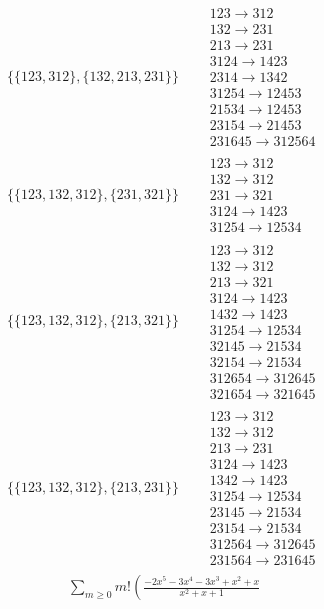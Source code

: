 \begin{tiny}
\begin{align}
\{\{123, 312\}, \{132, 213, 231\}\}
\quad
&
\begin{matrix}
123 \to 312\\132 \to 231\\213 \to 231\\3124 \to 1423\\2314 \to 1342\\31254 \to 12453\\21534 \to 12453\\23154 \to 21453\\231645 \to 312564
\end{matrix}
\\
\{\{123, 132, 312\}, \{231, 321\}\}
\quad
&
\begin{matrix}
123 \to 312\\132 \to 312\\231 \to 321\\3124 \to 1423\\31254 \to 12534
\end{matrix}
\\
\{\{123, 132, 312\}, \{213, 321\}\}
\quad
&
\begin{matrix}
123 \to 312\\132 \to 312\\213 \to 321\\3124 \to 1423\\1432 \to 1423\\31254 \to 12534\\32145 \to 21534\\32154 \to 21534\\312654 \to 312645\\321654 \to 321645
\end{matrix}
\\
\{\{123, 132, 312\}, \{213, 231\}\}
\quad
&
\begin{matrix}
123 \to 312\\132 \to 312\\213 \to 231\\3124 \to 1423\\1342 \to 1423\\31254 \to 12534\\23145 \to 21534\\23154 \to 21534\\312564 \to 312645\\231564 \to 231645
\end{matrix}
\end{align}
$$
\begin{matrix}
\sum_{m \geq 0} m! \left(
\frac{-2 x^{5} - 3 x^{4} - 3 x^{3} + x^{2} + x}{x^{2} + x + 1}

\end{matrix}$$
\end{tiny}
